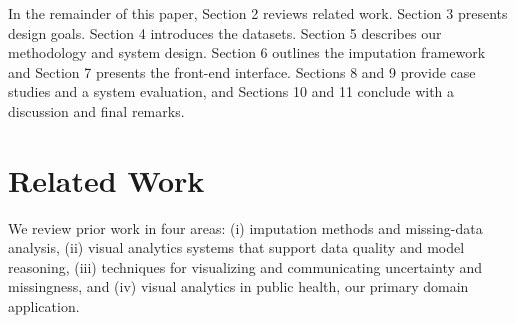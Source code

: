 \documentclass{egpubl}
\newcommand{\gknn}{gKNN\xspace}
\newcommand{\mice}{MICE\xspace}
\begin{document}

In the remainder of this paper, Section 2 reviews related work. Section 3 presents design goals. Section 4 introduces the datasets. Section 5 describes our methodology and system design. Section 6 outlines the imputation framework and Section 7 presents the front-end interface. Sections 8 and 9 provide case studies and a system evaluation, and Sections 10 and 11 conclude with a discussion and final remarks.

\section{Related Work}
\label{sec:related}
We review prior work in four areas: (i) imputation methods and missing-data analysis, (ii) visual analytics systems that support data quality and model reasoning, (iii) techniques for visualizing and communicating uncertainty and missingness, and (iv) visual analytics in public health, our primary domain application.
\end{document}
